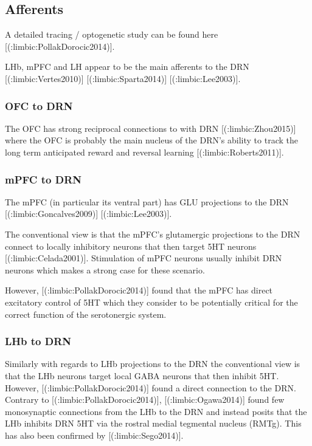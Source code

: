 \subsection{Afferents}

A detailed tracing / optogenetic study can be found here  [(:limbic:PollakDorocic2014)].

LHb, mPFC and LH appear to be the main afferents to the DRN [(:limbic:Vertes2010)] [(:limbic:Sparta2014)] [(:limbic:Lee2003)].

\subsubsection{OFC to DRN}

The OFC has strong reciprocal connections to with DRN [(:limbic:Zhou2015)] where the OFC is probably the main nucleus of the DRN's ability to track the long term anticipated reward and reversal learning [(:limbic:Roberts2011)].

\subsubsection{mPFC to DRN}

The mPFC (in particular its ventral part) has GLU projections to the DRN [(:limbic:Goncalves2009)] [(:limbic:Lee2003)].

The conventional view is that the mPFC’s glutamergic projections to the DRN connect to locally inhibitory neurons that then target 5HT neurons [(:limbic:Celada2001)]. Stimulation of mPFC neurons usually inhibit DRN neurons which makes a strong case for these scenario.

However, [(:limbic:PollakDorocic2014)] found that the mPFC has direct excitatory control of 5HT which they consider to be potentially critical for the correct function of the serotonergic system. 

\subsubsection{LHb to DRN}

Similarly with regards to LHb projections to the DRN the conventional view is that the LHb neurons
target local GABA neurons that then inhibit 5HT. However, [(:limbic:PollakDorocic2014)] found a direct connection to the DRN. Contrary to [(:limbic:PollakDorocic2014)], [(:limbic:Ogawa2014)] found few monosynaptic connections from the LHb to the DRN and instead posits that the LHb inhibits DRN 5HT via the rostral medial tegmental nucleus (RMTg). This has also been confirmed by [(:limbic:Sego2014)].

